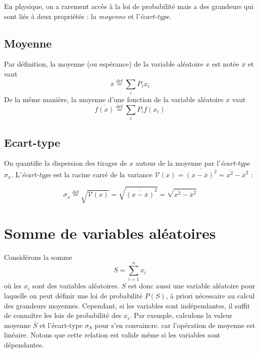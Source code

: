 En physique, on a rarement accès à la loi de probabilité mais a des grandeurs qui sont liés à deux propriétés : la \emph{moyenne} et l'\emph{écart-type}.
\subsection*{Moyenne}
Par définition, la moyenne (ou espérance)  de la variable aléatoire $x$ est notée $\overline{x}$ et vaut
	\[\overline{x}\stackrel{\text{def}}=\sum_{i}P_{i}x_{i}\]
De la même manière, la moyenne d'une fonction de la variable aléatoire $x$ vaut
	\[\overline{f(x)}\stackrel{\text{def}}=\sum_{i}P_{i}f(x_{i})\] 
\subsection*{Ecart-type}
On quantifie la dispersion des tirages de $x$ autour de la moyenne par l'\emph{écart-type} $\sigma_{x}$. L'\emph{écart-type} est la racine carré de la variance $\mathcal{V}(x)=\overline{(x-\overline{x})^{2}}=\overline{x^{2}}-\overline{x}^{2}$ :

	\[\sigma_{x}\stackrel{\text{def}}= \sqrt{\mathcal{V}(x)}=\sqrt{\overline{(x-\overline{x})}^{2}}=\sqrt{\overline{x^{2}}-\overline{x}^{2}}\]


\section{Somme de variables aléatoires}
Considérons la somme 
\[S=\sum_{i=1}^{n}x_{i}\]
où les $x_{i}$ sont des variables aléatoires. $S$ est donc aussi une variable aléatoire pour laquelle on peut définir une loi de probabilité $P(S)$, à priori nécessaire au calcul des grandeurs moyennes. Cependant, si les variables sont indépendantes, il suffit de connaître les lois de probabilité des $x_{i}$. Par exemple, calculons la valeur moyenne $\overline{S}$ et l'écart-type $\sigma_{S}$ pour s'en convaincre.
car l'opération de moyenne est linéaire. Notons que cette relation est valide même si les variables sont dépendantes. 

